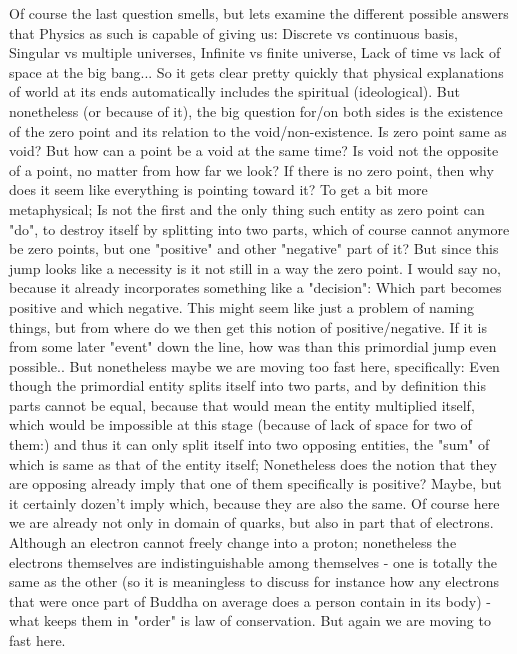 \documentclass[10pt]{book}
\begin{document}
Of course the last question smells, but lets examine the different possible answers that Physics as such is capable of giving us: Discrete vs continuous basis, Singular vs multiple universes, Infinite vs finite universe, Lack of time vs lack of space at the big bang... So it gets clear pretty quickly that physical explanations of world at its ends automatically includes the spiritual (ideological).
But nonetheless (or because of it), the big question for/on both sides is the existence of the zero point and its relation to the void/non-existence. Is zero point same as void? But how can a point be a void at the same time? Is void not the opposite of a point, no matter from how far we look? If there is no zero point, then why does it seem like everything is pointing toward it?
To get a bit more metaphysical; Is not the first and the only thing such entity as zero point can "do", to destroy itself by splitting into two parts, which of course cannot anymore be zero points, but one "positive" and other "negative" part of it? But since this jump looks like a necessity is it not still in a way the zero point. I would say no, because it already incorporates something like a "decision": Which part becomes positive and which negative. This might seem like just a problem of naming things, but from where do we then get this notion of positive/negative. If it is from some later "event" down the line, how was than this primordial jump even possible.. But nonetheless maybe we are moving too fast here, specifically: Even though the primordial entity splits itself into two parts, and by definition this parts cannot be equal, because that would mean the entity multiplied itself, which would be impossible at this stage (because of lack of space for two of them:) and thus it can only split itself into two opposing entities, the "sum" of which is same as that of the entity itself; Nonetheless does the notion that they are opposing already imply that one of them specifically is positive? Maybe, but it certainly dozen't imply which, because they are also the same. Of course here we are already not only in domain of quarks, but also in part that of electrons. Although an electron cannot freely change into a proton; nonetheless the electrons themselves are indistinguishable among themselves - one is totally the same as the other (so it is meaningless to discuss for instance how any electrons that were once part of Buddha on average does a person contain in its body) - what keeps them in "order" is law of conservation. But again we are moving to fast here. 
\end{document}
